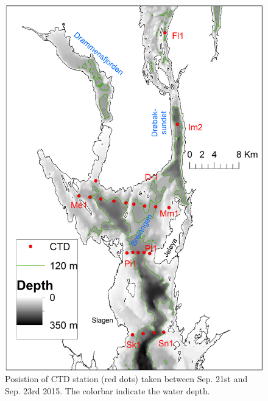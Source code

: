 \documentclass[12pt,a4paper,english]{article}
\begin{document}
\begin{figure}[ht]
\centerline{
\includegraphics*[width=\textwidth]{Figurer/Kart_Breiangen.png}}
\caption{\small
Posistion of CTD station (red dots) taken between Sep. 21st and Sep. 23rd 2015.
The colorbar indicate the water depth.}
\label{fig:CTD_Kart}
\end{figure}
\end{document}
